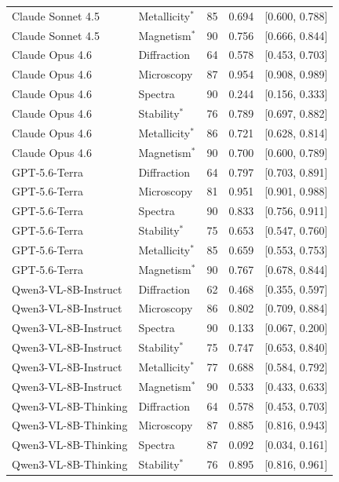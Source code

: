 \documentclass[11pt,a4paper]{article}
\begin{document}
\begin{table}[htbp]
{\begin{tabular}{l l S[table-format=3.0] S[table-format=1.3] c}
Claude Sonnet 4.5 & Metallicity$^{*}$ & 85 & 0.694 & [0.600, 0.788] \\
Claude Sonnet 4.5 & Magnetism$^{*}$ & 90 & 0.756 & [0.666, 0.844] \\
\addlinespace
Claude Opus 4.6 & Diffraction & 64 & 0.578 & [0.453, 0.703] \\
Claude Opus 4.6 & Microscopy & 87 & 0.954 & [0.908, 0.989] \\
Claude Opus 4.6 & Spectra & 90 & 0.244 & [0.156, 0.333] \\
Claude Opus 4.6 & Stability$^{*}$ & 76 & 0.789 & [0.697, 0.882] \\
Claude Opus 4.6 & Metallicity$^{*}$ & 86 & 0.721 & [0.628, 0.814] \\
Claude Opus 4.6 & Magnetism$^{*}$ & 90 & 0.700 & [0.600, 0.789] \\
\addlinespace
GPT-5.6-Terra & Diffraction & 64 & 0.797 & [0.703, 0.891] \\
GPT-5.6-Terra & Microscopy & 81 & 0.951 & [0.901, 0.988] \\
GPT-5.6-Terra & Spectra & 90 & 0.833 & [0.756, 0.911] \\
GPT-5.6-Terra & Stability$^{*}$ & 75 & 0.653 & [0.547, 0.760] \\
GPT-5.6-Terra & Metallicity$^{*}$ & 85 & 0.659 & [0.553, 0.753] \\
GPT-5.6-Terra & Magnetism$^{*}$ & 90 & 0.767 & [0.678, 0.844] \\
\addlinespace
Qwen3-VL-8B-Instruct & Diffraction & 62 & 0.468 & [0.355, 0.597] \\
Qwen3-VL-8B-Instruct & Microscopy & 86 & 0.802 & [0.709, 0.884] \\
Qwen3-VL-8B-Instruct & Spectra & 90 & 0.133 & [0.067, 0.200] \\
Qwen3-VL-8B-Instruct & Stability$^{*}$ & 75 & 0.747 & [0.653, 0.840] \\
Qwen3-VL-8B-Instruct & Metallicity$^{*}$ & 77 & 0.688 & [0.584, 0.792] \\
Qwen3-VL-8B-Instruct & Magnetism$^{*}$ & 90 & 0.533 & [0.433, 0.633] \\
\addlinespace
Qwen3-VL-8B-Thinking & Diffraction & 64 & 0.578 & [0.453, 0.703] \\
Qwen3-VL-8B-Thinking & Microscopy & 87 & 0.885 & [0.816, 0.943] \\
Qwen3-VL-8B-Thinking & Spectra & 87 & 0.092 & [0.034, 0.161] \\
Qwen3-VL-8B-Thinking & Stability$^{*}$ & 76 & 0.895 & [0.816, 0.961] \\

\end{tabular}}
\end{table}
\end{document}
